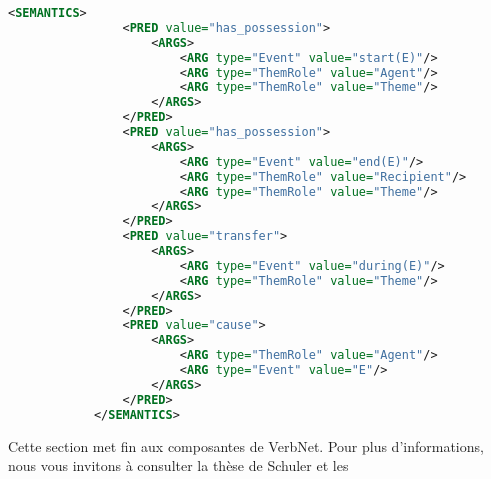 \begin{lstlisting}[language=Xml, caption=Les prédicats sémantiques, label=cadresem]
<SEMANTICS>
                <PRED value="has_possession">
                    <ARGS>
                        <ARG type="Event" value="start(E)"/>
                        <ARG type="ThemRole" value="Agent"/>
                        <ARG type="ThemRole" value="Theme"/>
                    </ARGS>
                </PRED>
                <PRED value="has_possession">
                    <ARGS>
                        <ARG type="Event" value="end(E)"/>
                        <ARG type="ThemRole" value="Recipient"/>
                        <ARG type="ThemRole" value="Theme"/>
                    </ARGS>
                </PRED>
                <PRED value="transfer">
                    <ARGS>
                        <ARG type="Event" value="during(E)"/>
                        <ARG type="ThemRole" value="Theme"/>
                    </ARGS>
                </PRED>
                <PRED value="cause">
                    <ARGS>
                        <ARG type="ThemRole" value="Agent"/>
                        <ARG type="Event" value="E"/>
                    </ARGS>
                </PRED>
            </SEMANTICS>
\end{lstlisting}

Cette section met fin aux composantes de VerbNet. Pour plus d'informations, nous vous invitons à consulter la thèse de Schuler \cite{SchulerVerbnetBroadcoverageComprehensive2005} et les 
